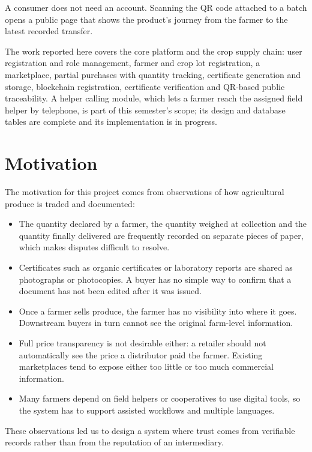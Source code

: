 A consumer does not need an account. Scanning the QR code attached to a batch opens a public page that shows the product's journey from the farmer to the latest recorded transfer.

The work reported here covers the core platform and the crop supply chain: user registration and role management, farmer and crop lot registration, a marketplace, partial purchases with quantity tracking, certificate generation and storage, blockchain registration, certificate verification and QR-based public traceability. A helper calling module, which lets a farmer reach the assigned field helper by telephone, is part of this semester's scope; its design and database tables are complete and its implementation is in progress.

\section{Motivation}\label{sec2}
The motivation for this project comes from observations of how agricultural produce is traded and documented:
\begin{itemize}
	\item The quantity declared by a farmer, the quantity weighed at collection and the quantity finally delivered are frequently recorded on separate pieces of paper, which makes disputes difficult to resolve.
	\item Certificates such as organic certificates or laboratory reports are shared as photographs or photocopies. A buyer has no simple way to confirm that a document has not been edited after it was issued.
	\item Once a farmer sells produce, the farmer has no visibility into where it goes. Downstream buyers in turn cannot see the original farm-level information.
	\item Full price transparency is not desirable either: a retailer should not automatically see the price a distributor paid the farmer. Existing marketplaces tend to expose either too little or too much commercial information.
	\item Many farmers depend on field helpers or cooperatives to use digital tools, so the system has to support assisted workflows and multiple languages.
\end{itemize}
These observations led us to design a system where trust comes from verifiable records rather than from the reputation of an intermediary.

